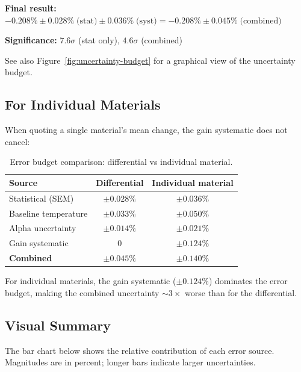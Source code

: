 \documentclass[11pt,letterpaper]{article}
\begin{document}
\textbf{Final result:}
$-0.208\% \pm 0.028\%\;\text{(stat)} \pm 0.036\%\;\text{(syst)} = -0.208\% \pm 0.045\%\;\text{(combined)}$

\textbf{Significance:} $7.6\sigma$ (stat only), $4.6\sigma$ (combined)

See also Figure~\ref{fig:uncertainty-budget} for a graphical view of the
uncertainty budget.

\subsection{For Individual Materials}

When quoting a single material's mean change, the gain systematic does not
cancel:

\begin{table}[htbp]
\centering
\caption{Error budget comparison: differential vs individual material.}
\label{tab:errbudget-indiv}
\begin{tabular}{@{}lcc@{}}
\toprule
Source & Differential & Individual material \\
\midrule
Statistical (SEM)         & $\pm 0.028\%$ & $\pm 0.036\%$ \\
Baseline temperature      & $\pm 0.033\%$ & $\pm 0.050\%$ \\
Alpha uncertainty         & $\pm 0.014\%$ & $\pm 0.021\%$ \\
Gain systematic           & 0             & $\pm 0.124\%$ \\
\midrule
\textbf{Combined}         & $\boldsymbol{\pm 0.045\%}$ & $\boldsymbol{\pm 0.140\%}$ \\
\bottomrule
\end{tabular}
\end{table}

For individual materials, the gain systematic ($\pm 0.124\%$) dominates the
error budget, making the combined uncertainty ${\sim}3\times$ worse than for the
differential.

\subsection{Visual Summary}

The bar chart below shows the relative contribution of each error source.
Magnitudes are in percent; longer bars indicate larger uncertainties.
\end{document}
